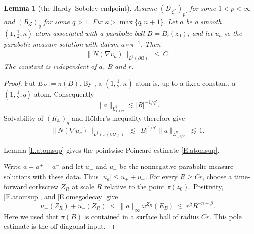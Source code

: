 \documentclass[12pt,leqno]{amsart}
\numberwithin{equation}{section}
\newcommand{\pom}{\partial\Omega}
\newcommand{\LL}{\mathcal L}
\newcommand{\Nt}{\widetilde N}
\theoremstyle{plain}
\newtheorem{lemma}[equation]{Lemma}
\theoremstyle{remark}
\begin{document}
\begin{lemma}[the Hardy--Sobolev endpoint]\label{L.atomendpoint}
Assume $(D_{\LL^*})_{p'}$ for some $1<p<\infty$ and $(R_{\LL})_q$ for some
$q>1$. Fix $\kappa>\max\{q,n+1\}$. Let $a$ be a smooth
$(1,\tfrac12,\kappa)$-atom associated with a parabolic ball $B=B_r(z_0)$,
and let $u_a$ be the parabolic-measure solution with datum $a\circ\pi^{-1}$.
Then
\begin{equation}\label{E.atomendpoint}
 \|\Nt(\nabla u_a)\|_{L^1(\pom)}\ \le\ C.
\end{equation}
The constant is independent of $a$, $B$ and $r$.
\end{lemma}

\begin{proof}
Put $E_B:=\pi(B)$. By \cite[Lemma 6.6]{DN}, a
$(1,\tfrac12,\kappa)$-atom is, up to a fixed constant, a
$(1,\tfrac12,q)$-atom. Consequently
\[
 \|a\|_{\dot L^q_{1,1/2}}\lesssim |B|^{-1/q'}.
\]
Solvability of $(R_{\LL})_q$ and H\"older's inequality therefore give
\begin{equation}\label{E.atomnear}
 \|\Nt(\nabla u_a)\|_{L^1(\pi(8B))}
 \ \lesssim\ |B|^{1/q'}\|a\|_{\dot L^q_{1,1/2}}\ \lesssim\ 1.
\end{equation}

Lemma \ref{L.atomsup} gives the pointwise Poincar\'e estimate
\eqref{E.atomsup}.

Write $a=a^+-a^-$ and let $u_+$ and $u_-$ be the nonnegative
parabolic-measure solutions with these data. Thus
$|u_a|\le u_++u_-$. For every $R\ge Cr$, choose a time-forward corkscrew
$Z_R$ at scale $R$ relative to the point $\pi(z_0)$. Positivity,
\eqref{E.atomsup}, and \eqref{E.omegadecay} give
\begin{equation}\label{E.atompole}
 u_+(Z_R)+u_-(Z_R)
 \ \le\ \|a\|_\infty\omega^{Z_R}(E_B)
 \ \lesssim\ r^\beta R^{-n-\beta}.
\end{equation}
Here we used that $\pi(B)$ is contained in a surface ball of radius $Cr$.
This pole estimate is the off-diagonal input.


\end{proof}
\end{document}
